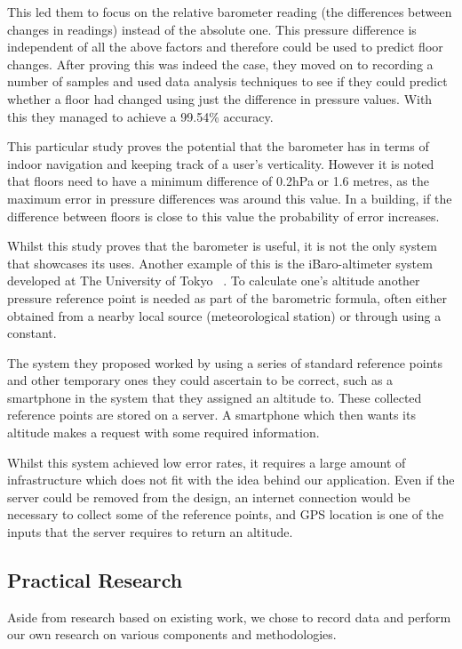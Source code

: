 \documentclass[12pt,a4paper]{report}
\begin{document}
This led them to focus on the relative barometer reading (the differences between changes in readings) instead of the absolute one. This pressure difference is independent of all the above factors and therefore could be used to predict floor changes. After proving this was indeed the case, they moved on to recording a number of samples and used data analysis techniques to see if they could predict whether a floor had changed using just the difference in pressure values. With this they managed to achieve a 99.54\% accuracy.

This particular study proves the potential that the barometer has in terms of indoor navigation and keeping track of a user's verticality. However it is noted that floors need to have a minimum difference of 0.2hPa or 1.6 metres, as the maximum error in pressure differences was around this value. In a building, if the difference between floors is close to this value the probability of error increases.

Whilst this study proves that the barometer is useful, it is not the only system that showcases its uses. Another example of this is the iBaro-altimeter system developed at The University of Tokyo ~\cite{baro22014}. To calculate one's altitude another pressure reference point is needed as part of the barometric formula, often either obtained from a nearby local source (meteorological station) or through using a constant.

The system they proposed worked by using a series of standard reference points and other temporary ones they could ascertain to be correct, such as a smartphone in the system that they assigned an altitude to. These collected reference points are stored on a server. A smartphone which then wants its altitude makes a request with some required information.

Whilst this system achieved low error rates, it requires a large amount of infrastructure which does not fit with the idea behind our application. Even if the server could be removed from the design, an internet connection would be necessary to collect some of the reference points, and GPS location is one of the inputs that the server requires to return an altitude.

\subsection{Practical Research}

Aside from research based on existing work, we chose to record data and perform our own research on various components and methodologies.
\end{document}

